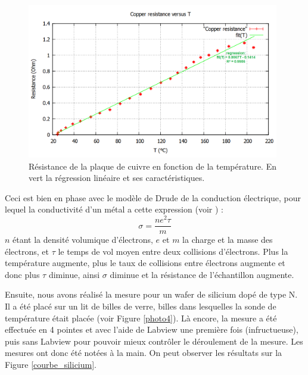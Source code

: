 \begin{figure}[hb]
  \begin{center}
		\includegraphics[width=11cm]{./images/Resistance_Cuivre_finale_english.png}
		\caption{Résistance de la plaque de cuivre en fonction de la température. En vert la régression linéaire et ses caractéristiques.}
		\label{courbe_cuivre}
	\end{center}
\end{figure}

\newpage

Ceci est bien en phase avec le modèle de Drude de la conduction électrique, pour lequel la conductivité d'un métal a cette expression (voir \cite{kittel_introduction_1976}) : 
\begin{equation}
	\sigma = \frac{n e^{2} \tau}{m}
\end{equation}
$n$ étant la densité volumique d'électrons, $e$ et $m$ la charge et la masse des électrons, et $\tau$ le temps de vol moyen entre deux collisions d'électrons. Plus la température augmente, plus le taux de collisions entre électrons augmente et donc plus $\tau$ diminue, ainsi $\sigma$ diminue et la résistance de l'échantillon augmente.

\bigskip

Ensuite, nous avons réalisé la mesure pour un wafer de silicium dopé de type N. Il a été placé sur un lit de billes de verre, billes dans lesquelles la sonde de température était placée (voir Figure \ref{photo4}). Là encore, la mesure a été effectuée en 4 pointes et avec l'aide de Labview une première fois (infructueuse), puis sans Labview pour pouvoir mieux contrôler le déroulement de la mesure. Les mesures ont donc été notées à la main. On peut observer les résultats sur la Figure \ref{courbe_silicium}.

